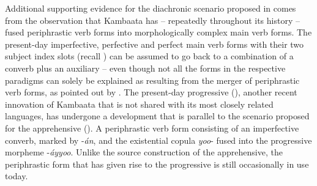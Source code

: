 \documentclass[output=paper,colorlinks,citecolor=brown,
]{langsci/langscibook}
\begin{document}
Additional supporting evidence for the diachronic scenario proposed in  comes from the observation that Kambaata has -- repeatedly throughout its history -- fused periphrastic verb forms into morphologically complex main verb forms. The present-day imperfective, perfective and perfect main verb forms with their two subject index slots (recall ) can be assumed to go back to a combination of a converb plus an auxiliary -- even though not all the forms in the respective paradigms can solely be explained as resulting from the merger of periphrastic verb forms, as pointed out by \citet{Tosco1996}. The present-day progressive (), another recent innovation of Kambaata that is not shared with its most closely related languages, has undergone a development that is parallel to the scenario proposed for the apprehensive (). A periphrastic verb form consisting of an imperfective converb, marked by \nobreakdash-\textit{án}, and the existential copula \textit{yoo}- fused into the progressive morpheme \nobreakdash-\textit{áyyoo}. Unlike the source construction of the apprehensive, the periphrastic form that has given rise to the progressive is still occasionally in use today.

\end{document}
